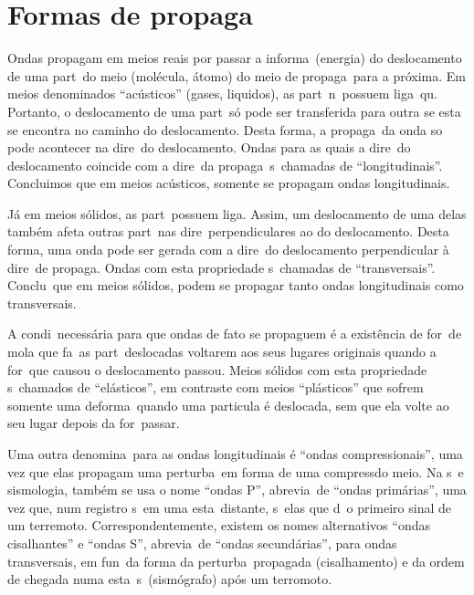 \section{Formas de propaga\cao}

Ondas propagam em meios reais por passar a informa\cao\ (energia) do 
deslocamento de uma part\icula\ do meio (mol\'ecula, \'atomo) do meio de
propaga\cao\ para a pr\'oxima. Em meios denominados ``ac\'usticos''
(gases, liquidos), as part\iculas\ n\ao\ possuem liga\coes\ qu\imicas.
Portanto, o deslocamento de uma part\icula\ s\'o pode ser transferida para
outra se esta se encontra no caminho do deslocamento. Desta forma, a
propaga\cao\ da onda so pode acontecer na dire\cao\ do deslocamento.
Ondas para as quais a dire\cao\ do deslocamento coincide com a dire\cao\
da propaga\cao\ s\ao\ chamadas de ``longitudinais''. Concluimos que em
meios ac\'usticos, somente se propagam ondas longitudinais.

J\'a em meios s\'olidos, as part\iculas\ possuem liga\coes. Assim, um
deslocamento de uma delas tamb\'em afeta outras part\iculas\ nas
dire\coes\ perpendiculares ao do deslocamento. Desta forma, uma onda pode ser gerada com a
dire\cao\ do deslocamento perpendicular \`a dire\cao\ de propaga\cao.
Ondas com esta propriedade s\ao\ chamadas de ``transversais''.
Conclu\imos\ que em meios s\'olidos, podem se propagar tanto ondas
longitudinais como transversais.

A condi\cao\ necess\'aria para que ondas de fato se propaguem \'e a
exist\^encia de for\cas\ de mola que fa\cam\ as part\iculas\ deslocadas
voltarem aos seus lugares originais quando a for\ca\ que causou o
deslocamento passou. Meios s\'olidos com esta propriedade s\ao\ chamados
de ``el\'asticos'', em contraste com meios ``pl\'asticos'' que sofrem
somente uma deforma\cao\ quando uma particula \'e deslocada, sem que ela
volte ao seu lugar depois da for\ca\ passar.

Uma outra denomina\cao\ para as ondas longitudinais \'e ``ondas
compressionais'', uma vez que elas propagam uma perturba\cao\ em forma
de uma compress\ao do meio. Na s\ismica\ e sismologia, tamb\'em se usa o
nome ``ondas P'', abrevia\cao\ de ``ondas prim\'arias'', uma vez que,
num registro s\ismico\ em uma esta\cao\ distante, s\ao\ elas que d\ao\ o
primeiro sinal de um terremoto. Correspondentemente, existem os nomes
alternativos ``ondas cisalhantes'' e ``ondas S'', abrevia\cao\ de
``ondas secund\'arias'', para ondas transversais, em fun\cao\ da forma
da perturba\cao\ propagada (cisalhamento) e da ordem de chegada numa
esta\cao\ s\ismica\ (sism\'ografo) ap\'os um terromoto.

